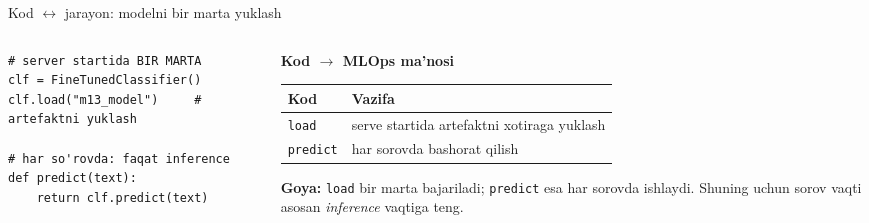 \documentclass[aspectratio=169,11pt]{beamer}
\newcommand{\uzq}{\textquotesingle{}}   %
\begin{document}
\begin{frame}[fragile]{Kod $\leftrightarrow$ jarayon: modelni bir marta yuklash}
  \small

  \begin{columns}[T,totalwidth=\textwidth]
    \begin{column}{0.59\textwidth}
\begin{lstlisting}[basicstyle=\ttfamily\scriptsize]
# server startida BIR MARTA
clf = FineTunedClassifier()
clf.load("m13_model")     # artefaktni yuklash

# har so'rovda: faqat inference
def predict(text):
    return clf.predict(text)
\end{lstlisting}
    \end{column}

    \begin{column}{0.38\textwidth}
      \textbf{Kod $\to$ MLOps ma'nosi}\\[3pt]

      \footnotesize
      \renewcommand{\arraystretch}{1.12}
      \begin{tabular}{p{1.7cm}p{2.35cm}}
        \toprule
        \textbf{Kod} & \textbf{Vazifa} \\
        \midrule
        \texttt{load} &
        serve startida artefaktni xotiraga yuklash \\
        \texttt{predict} &
        har so\uzq{}rovda bashorat qilish \\
        \bottomrule
      \end{tabular}

      \vspace{5pt}

      \begin{tcolorbox}[okbox,top=2pt,bottom=2pt,left=3pt,right=3pt]
        \footnotesize
        \textbf{G\uzq{}oya:}
        \texttt{load} bir marta bajariladi;
        \texttt{predict} esa har so\uzq{}rovda ishlaydi.
        Shuning uchun so\uzq{}rov vaqti asosan \textit{inference} vaqtiga teng.
      \end{tcolorbox}
    \end{column}
  \end{columns}
\end{frame}
\end{document}
